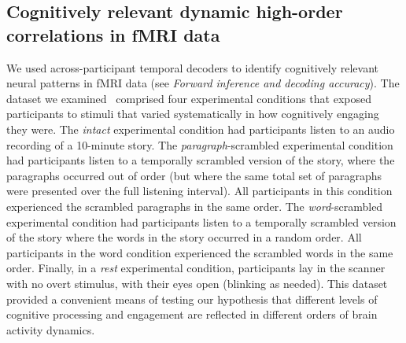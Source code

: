 \documentclass[english]{article}
\begin{document}
\subsection*{Cognitively relevant dynamic high-order correlations in
  fMRI data}
We used across-participant temporal decoders to identify cognitively
relevant neural patterns in fMRI data (see \textit{Forward inference
  and decoding accuracy}).  The dataset we examined~\citep[collected
by][]{SimoEtal16} comprised four experimental conditions that exposed
participants to stimuli that varied systematically in how cognitively
engaging they were.  The \textit{intact} experimental condition had
participants listen to an audio recording of a 10-minute story.  The
\textit{paragraph}-scrambled experimental condition had participants
listen to a temporally scrambled version of the story, where the
paragraphs occurred out of order (but where the same total set of
paragraphs were presented over the full listening interval).  All
participants in this condition experienced the scrambled paragraphs in
the same order.  The \textit{word}-scrambled experimental condition
had participants listen to a temporally scrambled version of the story
where the words in the story occurred in a random order.  All
participants in the word condition experienced the scrambled words in
the same order.  Finally, in a \textit{rest} experimental condition,
participants lay in the scanner with no overt stimulus, with their
eyes open (blinking as needed).  This dataset provided a convenient
means of testing our hypothesis that different levels of cognitive
processing and engagement are reflected in different orders of brain
activity dynamics.
\end{document}
